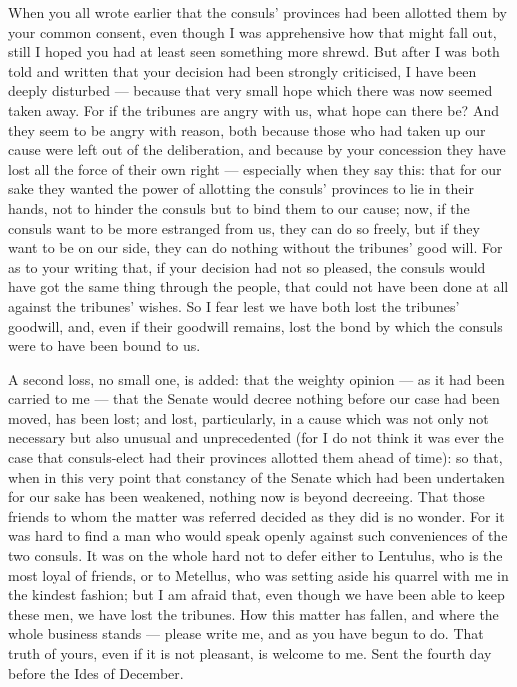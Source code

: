 

 When you all wrote earlier that the consuls' provinces had been allotted them by your common consent, even though I was apprehensive how that might fall out, still I hoped you had at least seen something more shrewd. But after I was both told and written that your decision had been strongly criticised, I have been deeply disturbed --- because that very small hope which there was now seemed taken away. For if the tribunes are angry with us, what hope can there be? And they seem to be angry with reason, both because those who had taken up our cause were left out of the deliberation, and because by your concession they have lost all the force of their own right --- especially when they say this: that for our sake they wanted the power of allotting the consuls' provinces to lie in their hands, not to hinder the consuls but to bind them to our cause; now, if the consuls want to be more estranged from us, they can do so freely, but if they want to be on our side, they can do nothing without the tribunes' good will. For as to your writing that, if your decision had not so pleased, the consuls would have got the same thing through the people, that could not have been done at all against the tribunes' wishes. So I fear lest we have both lost the tribunes' goodwill, and, even if their goodwill remains, lost the bond by which the consuls were to have been bound to us.

 A second loss, no small one, is added: that the weighty opinion --- as it had been carried to me --- that the Senate would decree nothing before our case had been moved, has been lost; and lost, particularly, in a cause which was not only not necessary but also unusual and unprecedented (for I do not think it was ever the case that consuls-elect had their provinces allotted them ahead of time): so that, when in this very point that constancy of the Senate which had been undertaken for our sake has been weakened, nothing now is beyond decreeing. That those friends to whom the matter was referred decided as they did is no wonder. For it was hard to find a man who would speak openly against such conveniences of the two consuls. It was on the whole hard not to defer either to Lentulus, who is the most loyal of friends, or to Metellus, who was setting aside his quarrel with me in the kindest fashion; but I am afraid that, even though we have been able to keep these men, we have lost the tribunes. How this matter has fallen, and where the whole business stands --- please write me, and as you have begun to do. That truth of yours, even if it is not pleasant, is welcome to me. Sent the fourth day before the Ides of December.
